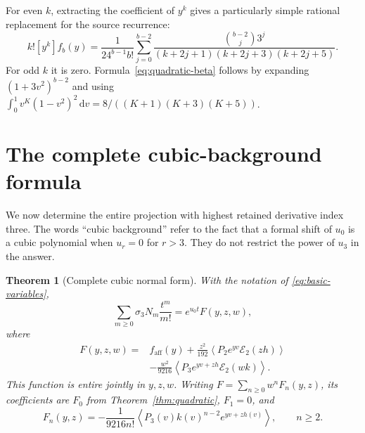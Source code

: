 \documentclass[11pt]{article}
\numberwithin{equation}{section}
\newtheorem{theorem}{Theorem}[section]
\theoremstyle{definition}\newtheorem{definition}[theorem]{Definition}
\theoremstyle{remark}\newtheorem{remark}[theorem]{Remark}
\newcommand{\avg}[1]{\left\langle #1\right\rangle}
\newcommand{\dd}{\,\mathrm d}
\newcommand{\Erem}{\mathcal E_2}
\begin{document}
For even $k$, extracting the coefficient of $y^k$ gives a particularly
simple rational replacement for the source recurrence:
\begin{equation}\label{eq:quadratic-beta}
 k![y^k]f_b(y)=\frac1{24^{b-1}b!}
 \sum_{j=0}^{b-2}
 \frac{\binom{b-2}{j}3^j}{(k+2j+1)(k+2j+3)(k+2j+5)}.
\end{equation}
For odd $k$ it is zero. Formula~\eqref{eq:quadratic-beta} follows by
expanding $(1+3v^2)^{b-2}$ and using
$\int_0^1v^K(1-v^2)^2\dd v=8/((K+1)(K+3)(K+5))$.


\clearpage
\section{The complete cubic-background formula}
\label{sec:cubic}

We now determine the entire projection with highest retained derivative
index three. The words ``cubic background'' refer to the fact that a
formal shift of $u_0$ is a cubic polynomial when $u_r=0$ for $r>3$.
They do not restrict the power of $u_3$ in the answer.

\begin{theorem}[Complete cubic normal form]\label{thm:main}
With the notation of \eqref{eq:basic-variables},
\begin{equation}\label{eq:main-generating}
 \sum_{m\ge0}\sigma_3N_m\frac{t^m}{m!}=e^{u_0t}F(y,z,w),
\end{equation}
where
\begin{equation}\label{eq:main}
\boxed{\begin{aligned}
 F(y,z,w)={}&f_{\mathrm{aff}}(y)
 +\frac{z^2}{192}\avg{P_2e^{yv}\Erem(zh)}\\
 &-\frac{w^2}{9216}\avg{P_3e^{yv+zh}\Erem(wk)}.
\end{aligned}}
\end{equation}
This function is entire jointly in $y,z,w$. Writing
$F=\sum_{n\ge0}w^nF_n(y,z)$, its coefficients are $F_0$ from
Theorem~\ref{thm:quadratic}, $F_1=0$, and
\begin{equation}\label{eq:Fn-density}
 F_n(y,z)=-\frac1{9216n!}
 \avg{P_3(v)k(v)^{n-2}e^{yv+zh(v)}},\qquad n\ge2.
\end{equation}
\end{theorem}
\end{document}
